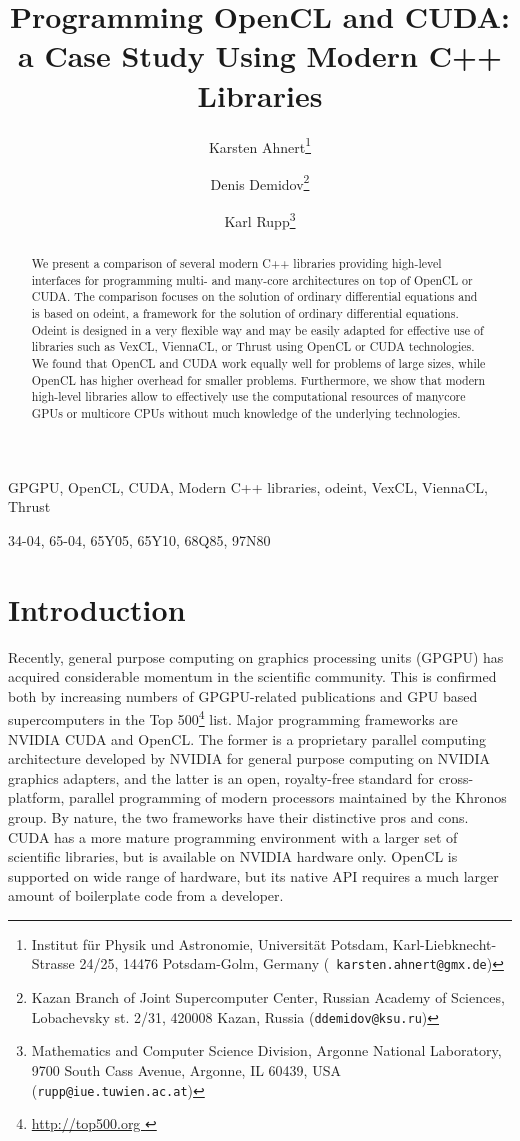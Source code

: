 \documentclass[final]{siamltex}
\title{Programming OpenCL and CUDA:\\a Case Study Using Modern C++ Libraries}
\author{
Karsten Ahnert\thanks{Institut f\"ur Physik und Astronomie, Universit\"at Potsdam,
Karl-Liebknecht-Strasse 24/25, 14476 Potsdam-Golm, Germany ({\tt
karsten.ahnert@gmx.de}) }
\and Denis Demidov\thanks{
Kazan Branch of Joint Supercomputer Center,
Russian Academy of Sciences,
Lobachevsky st. 2/31, 420008 Kazan, Russia
({\tt ddemidov@ksu.ru}) }
\and Karl Rupp\thanks{Mathematics and Computer Science Division,
Argonne National Laboratory,
9700 South Cass Avenue, Argonne, IL 60439, USA
({\tt rupp@iue.tuwien.ac.at}) } }
\begin{document}
\maketitle

\begin{abstract}
    We present a comparison of several modern C++ libraries providing high-level interfaces
    for programming multi- and many-core architectures on top of OpenCL or CUDA.
    The comparison focuses on the solution of ordinary differential equations and is based on odeint,
    a framework for the solution of ordinary differential equations. Odeint is designed in a
    very flexible way and may be easily adapted for effective use of libraries such
    as VexCL, ViennaCL, or Thrust using OpenCL or CUDA technologies.
    We found that OpenCL and CUDA work equally well for problems
    of large sizes, while OpenCL has higher overhead for smaller problems.
    Furthermore, we show that modern high-level libraries allow to effectively
    use the computational resources of manycore GPUs or multicore CPUs without much
    knowledge of the underlying technologies.
\end{abstract}

\begin{keywords}
    GPGPU, OpenCL, CUDA, Modern C++ libraries, odeint, VexCL, ViennaCL, Thrust
\end{keywords}

\begin{AMS}
    34-04, 65-04, 65Y05, 65Y10, 68Q85, 97N80
\end{AMS}


%
%
\section{Introduction}

\pagestyle{myheadings}

\thispagestyle{plain}


Recently, general purpose computing on graphics processing units (GPGPU) has
acquired considerable momentum in the scientific community. This is confirmed
both by increasing numbers of GPGPU-related publications and GPU based
supercomputers in the Top 500\footnote{ \href{ http://top500.org }{
http://top500.org }} list. Major programming frameworks are NVIDIA CUDA and
OpenCL.  The former is a proprietary parallel computing architecture developed
by NVIDIA for general purpose computing on NVIDIA graphics adapters, and the
latter is an open, royalty-free standard for cross-platform, parallel
programming of modern processors maintained by the Khronos group. By nature,
the two frameworks have their distinctive pros and cons. CUDA has a more mature
programming environment with a larger set of scientific libraries, but is 
available on NVIDIA hardware only. OpenCL is supported on wide range of hardware,
but its native API requires a much larger amount of boilerplate code from a
developer.
\end{document}
